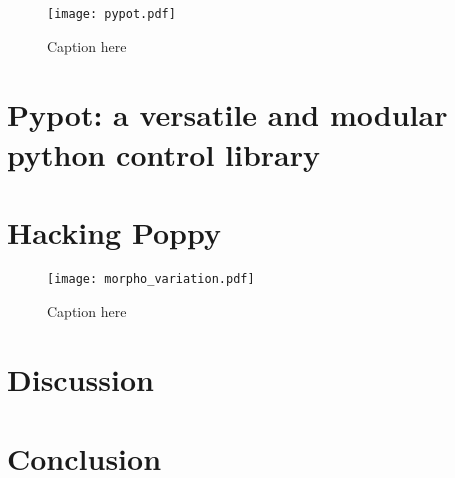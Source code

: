 \begin{figure}[tb]
    \begin{center}
        \texttt{[image: pypot.pdf]}
    \end{center}
    \caption{Caption here}
    \label{fig:figure1}
\end{figure}

\section{Pypot: a versatile and modular python control library}

\section{Hacking Poppy} %

\begin{figure}[tb]
    \begin{center}
        \texttt{[image: morpho\_variation.pdf]}
    \end{center}
    \caption{Caption here}
    \label{fig:figure1}
\end{figure}


\section{Discussion}

\section{Conclusion}

